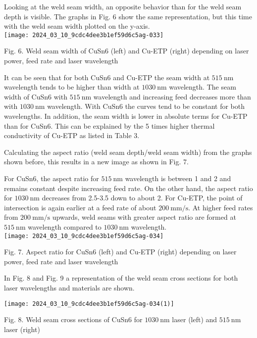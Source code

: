 \documentclass[10pt]{article}
\begin{document}
Looking at the weld seam width, an opposite behavior than for the weld seam depth is visible. The graphs in Fig. 6 show the same representation, but this time with the weld seam width plotted on the y-axis.\\
\texttt{[image: 2024\_03\_10\_9cdc4dee3b1ef59d6c5ag-033]}

Fig. 6. Weld seam width of CuSn6 (left) and Cu-ETP (right) depending on laser power, feed rate and laser wavelength

It can be seen that for both CuSn6 and Cu-ETP the seam width at $515 \mathrm{~nm}$ wavelength tends to be higher than width at $1030 \mathrm{~nm}$ wavelength. The seam width of CuSn6 with $515 \mathrm{~nm}$ wavelength and increasing feed decreases more than with $1030 \mathrm{~nm}$ wavelength. With CuSn6 the curves tend to be constant for both wavelengths. In addition, the seam width is lower in absolute terms for Cu-ETP than for CuSn6. This can be explained by the 5 times higher thermal conductivity of Cu-ETP as listed in Table 3.

Calculating the aspect ratio (weld seam depth/weld seam width) from the graphs shown before, this results in a new image as shown in Fig. 7.

For CuSn6, the aspect ratio for $515 \mathrm{~nm}$ wavelength is between 1 and 2 and remains constant despite increasing feed rate. On the other hand, the aspect ratio for $1030 \mathrm{~nm}$ decreases from 2.5-3.5 down to about 2. For Cu-ETP, the point of intersection is again earlier at a feed rate of about $200 \mathrm{~mm} / \mathrm{s}$. At higher feed rates from $200 \mathrm{~mm} / \mathrm{s}$ upwards, weld seams with greater aspect ratio are formed at $515 \mathrm{~nm}$ wavelength compared to $1030 \mathrm{~nm}$ wavelength.\\
\texttt{[image: 2024\_03\_10\_9cdc4dee3b1ef59d6c5ag-034]}

Fig. 7. Aspect ratio for CuSn6 (left) and Cu-ETP (right) depending on laser power, feed rate and laser wavelength

In Fig. 8 and Fig. 9 a representation of the weld seam cross sections for both laser wavelengths and materials are shown.

\begin{center}
\texttt{[image: 2024\_03\_10\_9cdc4dee3b1ef59d6c5ag-034(1)]}
\end{center}

Fig. 8. Weld seam cross sections of CuSn6 for $1030 \mathrm{~nm}$ laser (left) and $515 \mathrm{~nm}$ laser (right)
\end{document}
